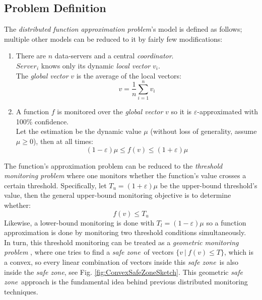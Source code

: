 \documentclass[10pt, conference]{IEEEtran}
\newcommand{\safeZone}{\textit{safe zone}}
\begin{document}
\subsection{Problem Definition}
The \textit{distributed function approximation problem}'s model \cite{garofalakis2013sketch} is defined as follows; multiple other models can be reduced to it by fairly few modifications:
\begin{enumerate}
\item There are $n$ data-servers and a central \textit{coordinator}. \\
$Server_i$ knows only its dynamic \textit{local vector} $v_i$. \\
The \textit{global vector} $v$ is the average of the local vectors:
\begin{equation}
v = \frac{1}{n}\sum\limits_{i=1}^n {v_i}
\end{equation}
\item A function $f$ is monitored over the \textit{global vector} $v$ so it is $\varepsilon$-approximated with 100\% confidence. \\ Let the estimation  be the dynamic value $\mu$ (without loss of generality, assume ${\mu \geq 0}$), then at all times: 
\begin{equation}
(1-\varepsilon )\mu \leq f(v) \leq (1+\varepsilon )\mu
\end{equation}
\end{enumerate}
The function's approximation problem can be reduced to the \textit{threshold monitoring problem} \cite{garofalakis2013sketch} where one monitors whether the function's value crosses a certain threshold. Specifically, let ${T_u = (1+\varepsilon )\mu}$ be the upper-bound threshold's value, then the general upper-bound monitoring objective is to determine whether:
\begin{equation}
f(v) \leq T_u
\end{equation}
Likewise, a lower-bound monitoring is done with ${T_l = (1-\varepsilon )\mu}$ so a function approximation is done by monitoring two threshold conditions simultaneously. \\
In turn, this threshold monitoring can be treated as a \textit{geometric monitoring problem} \cite{sharfman2007geometric}, where one tries to find a \safeZone \ of vectors ${\{v \ | \ f(v) \leq T\}}$, which is a convex, so every linear combination of vectors inside this \safeZone \ is also inside the \safeZone , see Fig. \ref{fig:ConvexSafeZoneSketch}. This geometric \safeZone \ approach is the fundamental idea behind previous distributed monitoring techniques.
\end{document}
